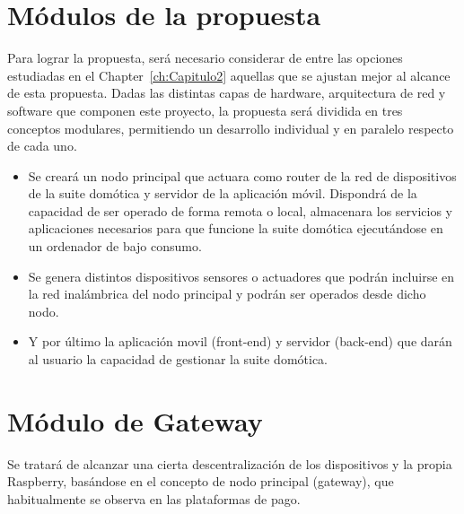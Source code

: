 \section{Módulos de la propuesta}
\label{ch:Capitulo3.1}
Para lograr la propuesta, será necesario considerar de entre las opciones estudiadas en el  Chapter~\ref{ch:Capitulo2} aquellas que se ajustan mejor al alcance de esta propuesta. Dadas las distintas capas de hardware, arquitectura de red y software que componen este proyecto, la propuesta será dividida en tres conceptos modulares, permitiendo un desarrollo individual y en paralelo respecto de cada uno.

\begin{itemize}

\item Se creará un nodo principal que actuara como router de la red de dispositivos de la suite domótica y servidor de la aplicación móvil. Dispondrá de la capacidad de ser operado de forma remota o local, almacenara los servicios y aplicaciones necesarios para que funcione la suite domótica ejecutándose en un ordenador de bajo consumo.

\item Se genera distintos dispositivos sensores o actuadores que podrán incluirse en la red inalámbrica del nodo principal y podrán ser operados desde dicho nodo.

\item Y por último la aplicación movil (front-end) y servidor (back-end) que darán al usuario la capacidad de gestionar la suite domótica.

\end{itemize}

\section{Módulo de Gateway}
\label{ch:Capitulo3.2}

Se tratará de alcanzar una cierta descentralización de los dispositivos y la propia Raspberry, basándose en el concepto de nodo principal (gateway), que habitualmente se observa en las plataformas de pago.

